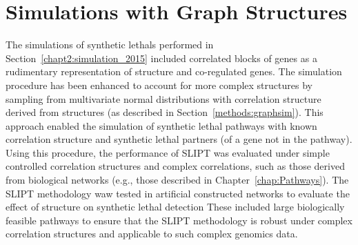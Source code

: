 

\iffalse
\section{Developing a linear model predictor of \glspl{synthetic lethal}}
\subsection{Linear models}
\subsection{Polynomial models}
\subsection{Conditioning}
\subsection{SLIPTv2}
\fi

\section{Simulations with Graph Structures}
\label{chapt5:graphsim}

The simulations of \glspl{synthetic lethal} performed in Section~\ref{chapt2:simulation_2015} included correlated blocks of genes as a rudimentary representation of  structure and co-regulated genes. The simulation procedure has been enhanced to account for more complex  structures by sampling from multivariate normal distributions with correlation structure derived from  structures (as described in Section~\ref{methods:graphsim}). This approach enabled the simulation of \gls{synthetic lethal} pathways with known correlation structure and synthetic lethal partners (of a gene not in the pathway).  Using this procedure, the performance of \gls{SLIPT} was evaluated under simple controlled correlation structures and complex correlations, such as those derived from biological networks (e.g., those described in Chapter~\ref{chap:Pathways}). The \gls{SLIPT} methodology waw tested in artificial constructed networks to evaluate the effect of  structure on \gls{synthetic lethal} detection These included large biologically feasible pathways to ensure that the \gls{SLIPT} methodology is robust under complex correlation structures and applicable to such complex \glspl{genomic} data.

